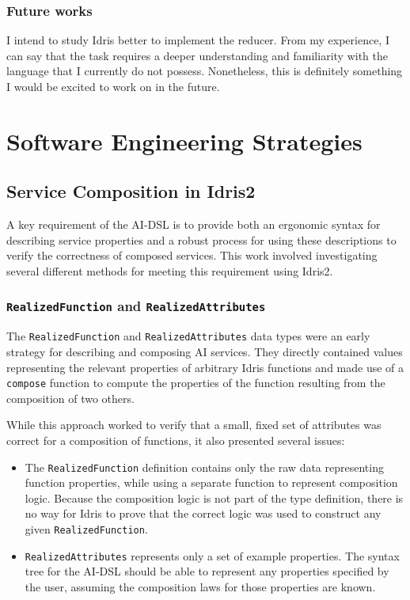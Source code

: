 \documentclass[]{report}
\begin{document}
\subsection{Future works}
I intend to study Idris better to implement the reducer. From my experience, I can say that the task 
requires a deeper understanding and familiarity with the language that I currently do not possess. 
Nonetheless, this is definitely something I would be excited to work on in the future.


\chapter{Software Engineering Strategies}
\label{chap:soft_eng_strat}
\section{Service Composition in Idris2}
\label{sec:service_composition_in_idris2}

A key requirement of the AI-DSL is to provide both an ergonomic syntax for
describing service properties and a robust process for using these descriptions
to verify the correctness of composed services.  This work involved
investigating several different methods for meeting this requirement using
Idris2.

\subsection{\texttt{RealizedFunction} and \texttt{RealizedAttributes}}
The \texttt{RealizedFunction} and \texttt{RealizedAttributes} data types were an
early strategy for describing and composing AI services.  They directly
contained values representing the relevant properties of arbitrary Idris
functions and made use of a \texttt{compose} function to compute the properties
of the function resulting from the composition of two others.

While this approach worked to verify that a small, fixed set of attributes was
correct for a composition of functions, it also presented several issues:

\begin{itemize}
  \item
        The \texttt{RealizedFunction} definition contains only the raw data
        representing function properties, while using a separate function to
        represent composition logic.  Because the composition logic is not
        part of the type definition, there is no way for Idris to prove that the
        correct logic was used to construct any given \texttt{RealizedFunction}.


  \item \texttt{RealizedAttributes} represents only a set of example properties.
        The syntax tree for the AI-DSL should be able to represent any
        properties specified by the user, assuming the composition laws for
        those properties are known.


\end{itemize}
\end{document}
